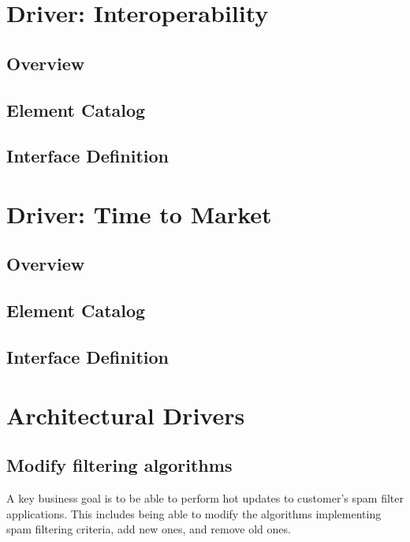 \documentclass[letterpaper,11pt]{article}
\begin{document}
\section{Driver: Interoperability}

\subsection{Overview}

\subsection{Element Catalog}

\subsection{Interface Definition}



\section{Driver: Time to Market}

\subsection{Overview}
\subsection{Element Catalog}
\subsection{Interface Definition}


\clearpage
\appendix
\section{Architectural Drivers}

\subsection{Modify filtering algorithms}
A key business goal is to be able to perform hot updates to customer’s spam
filter applications. This includes being able to modify the algorithms
implementing spam filtering criteria, add new ones, and remove old ones.
 
\end{document}

